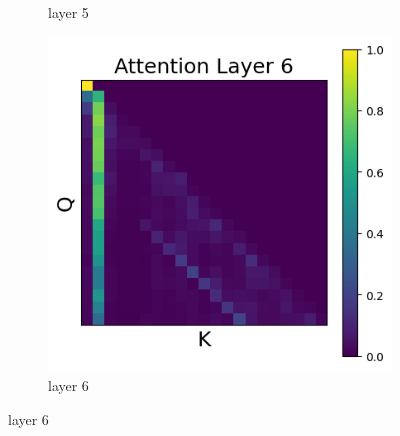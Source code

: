 \documentclass[11pt]{article}
\begin{document}
\begin{figure}[t]
\begin{subfigure}[t]{0.24\textwidth}
    \caption{layer 5}
  \end{subfigure}\hfill
  \begin{subfigure}[t]{0.24\textwidth}
    \centering
    \includegraphics[width=1.4\columnwidth]{figures/intervention3/layer_6.png}
    \caption{layer 6}
  \end{subfigure}\hfill


\end{figure}
\end{document}
